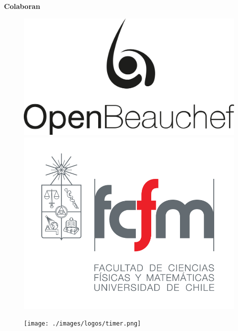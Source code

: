 \begin{titlepage}
  {\large\bfseries Colaboran}

  \begin{figure}[h!]
    \centering
    \begin{minipage}{.2\textwidth}
      \centering
      \includegraphics[width=\linewidth]{./images/logos/ob.png}
    \end{minipage}
    \hspace{1cm}
    \begin{minipage}{.3\textwidth}
      \centering
      \includegraphics[width=\linewidth]{./images/logos/fcfm_vertical_png.png}
    \end{minipage}
    \hspace{1cm}
    \begin{minipage}{.2\textwidth}
      \centering
      \texttt{[image: ./images/logos/timer.png]}
    \end{minipage}
  \end{figure}


\end{titlepage}
